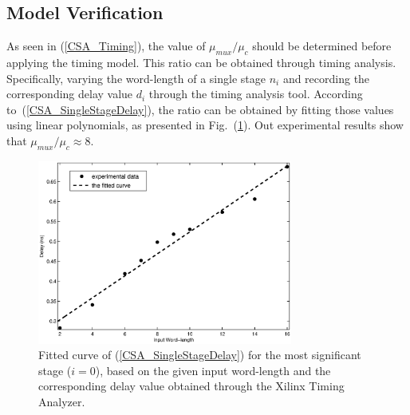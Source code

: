 \documentclass[journal]{IEEEtran}
\begin{document}
\subsection{Model Verification}
As seen in (\ref{CSA_Timing}), the value of $\mu_{mux}/\mu_c$ should be determined before applying the timing model. This ratio can be obtained through timing analysis. Specifically, varying the word-length of a single stage $n_i$ and recording the corresponding delay value $d_i$ through the timing analysis tool. According to~(\ref{CSA_SingleStageDelay}), the ratio can be obtained by fitting those values using linear polynomials, as presented in Fig.~(\ref{DelayFitting}). Out experimental results show that $\mu_{mux}/\mu_c\approx8$.
\begin{figure}[htbp]
  \centering
  \includegraphics[width=3.3in]{./Figures/Fitting.eps}
  \caption{Fitted curve of (\ref{CSA_SingleStageDelay}) for the most significant stage ($i=0$), based on the given input word-length and the corresponding delay value obtained through the Xilinx Timing Analyzer.}
  \label{DelayFitting}
\end{figure}
\end{document}
